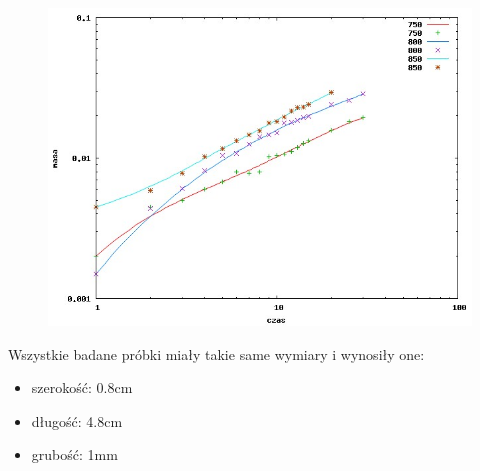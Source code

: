 \documentclass[a4paper,12pt]{article}
\begin{document}
\normalsize
\begin{center}
\begin{figure}[h]
\hspace{-50px}
\includegraphics[scale=0.7]{all.jpg}
\label{rys1}
\end{figure}
\end{center}
Wszystkie badane próbki miały takie same wymiary i wynosiły one:\\
\begin{itemize}
\item szerokość: 0.8cm
\item długość: 4.8cm
\item grubość: 1mm
\end{itemize}
\end{document}

